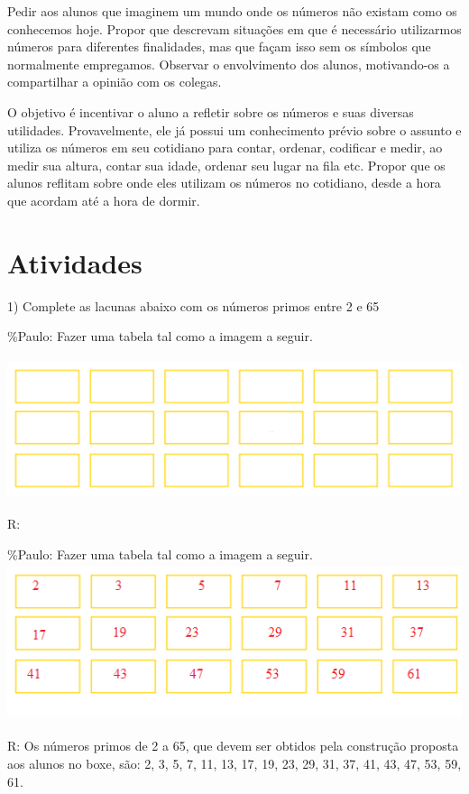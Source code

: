 {Pedir aos alunos que imaginem um mundo onde os números não existam como
os conhecemos hoje. Propor que descrevam situações em que é necessário
utilizarmos números para diferentes finalidades, mas que façam isso sem
os símbolos que normalmente empregamos. Observar o envolvimento dos
alunos, motivando-os a compartilhar a opinião com os colegas.

O objetivo é incentivar o aluno a refletir sobre os números e suas
diversas utilidades. Provavelmente, ele já possui um conhecimento prévio
sobre o assunto e utiliza os números em seu cotidiano para contar,
ordenar, codificar e medir, ao medir sua altura, contar sua idade,
ordenar seu lugar na fila etc. Propor que os alunos reflitam sobre onde
eles utilizam os números no cotidiano, desde a hora que acordam até a
hora de dormir.}

\section{Atividades}

1) Complete as lacunas abaixo com os números primos entre 2 e 65

\%Paulo: Fazer uma tabela tal como a imagem a seguir.

\includegraphics[width=5.54167in,height=1.625in]{./imgSAEB_6_MAT/media/image9.png}

R:

\%Paulo: Fazer uma tabela tal como a imagem a seguir.
\includegraphics[width=5.47708in,height=1.81389in]{./imgSAEB_6_MAT/media/image10.png}

R: Os números primos de 2 a 65, que devem ser obtidos pela construção
proposta aos alunos no boxe, são: 2, 3, 5, 7, 11, 13, 17, 19, 23, 29,
31, 37, 41, 43, 47, 53, 59, 61.

